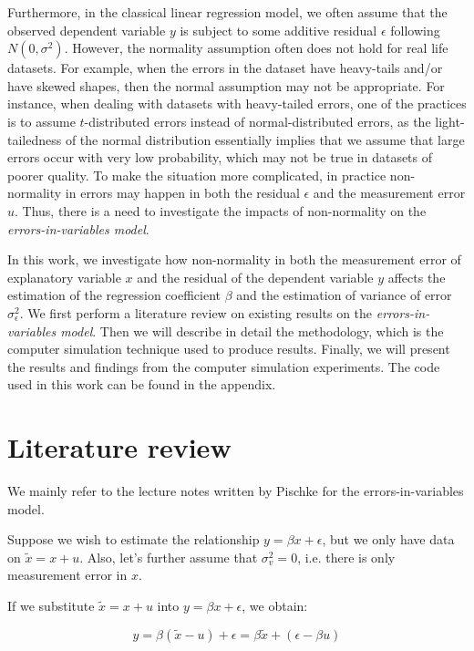 \documentclass{article}
\begin{document}
Furthermore, in the classical linear regression model, we often assume that the observed dependent variable $y$ is subject to some additive residual $\epsilon$ following $N(0, \sigma^2)$.
However, the normality assumption often does not hold for real life datasets.
For example, when the errors in the dataset have heavy-tails and/or have skewed shapes, then the normal assumption may not be appropriate.
For instance, when dealing with datasets with heavy-tailed errors, one of the practices is to assume $t$-distributed errors instead of normal-distributed errors,
as the light-tailedness of the normal distribution essentially implies that we assume that large errors occur with very low probability, which may not be true in datasets of poorer quality.
To make the situation more complicated, in practice non-normality in errors may happen in both the residual $\epsilon$ and the measurement error $u$.
Thus, there is a need to investigate the impacts of non-normality on the \textit{errors-in-variables model}. 

In this work, we investigate how non-normality in both the measurement error of explanatory variable $x$ and the residual of the dependent variable $y$ affects the estimation of the regression coefficient $\beta$ and the estimation of variance of error $\sigma^2_\epsilon$.
We first perform a literature review on existing results on the \textit{errors-in-variables model}.
Then we will describe in detail the methodology, which is the computer simulation technique used to produce results.
Finally, we will present the results and findings from the computer simulation experiments.
The code used in this work can be found in the appendix.

\section{Literature review}

We mainly refer to the lecture notes written by Pischke \cite{lecturenotes} for the errors-in-variables model. 

Suppose we wish to estimate the relationship $y = \beta x + \epsilon$, but we only have data on $\tilde{x} = x + u$. Also, let's further assume that $\sigma_v^2 = 0$, i.e. there is only measurement error in $x$.

If we substitute $\tilde{x} = x+u$ into $y = \beta x + \epsilon$, we obtain:

\begin{equation}
    y = \beta(\tilde{x} - u) + \epsilon = \beta \tilde{x} + (\epsilon - \beta u)
\end{equation}
\end{document}

